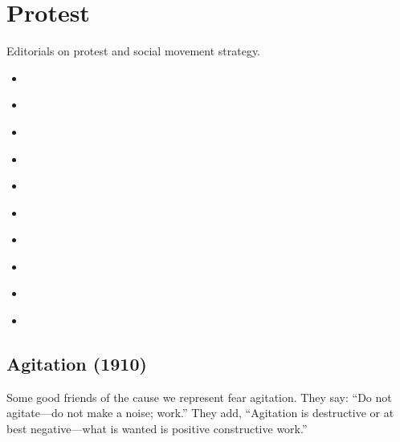 \documentclass[letterpaper,10pt,english]{jupyterBook}
\begin{document}
\section{Protest}
\label{\detokenize{Sections/protest:protest}}\label{\detokenize{Sections/protest::doc}}
\sphinxAtStartPar
Editorials on protest and social movement strategy.
\begin{itemize}
\item {} 
\sphinxAtStartPar
{\hyperref[\detokenize{Volumes/01/01/Agitation::doc}]{}}

\item {} 
\sphinxAtStartPar
{\hyperref[\detokenize{Volumes/05/05/proper_way::doc}]{}}

\item {} 
\sphinxAtStartPar
{\hyperref[\detokenize{Volumes/16/03/close_ranks::doc}]{}}

\item {} 
\sphinxAtStartPar
{\hyperref[\detokenize{Volumes/19/01/statement::doc}]{}}

\item {} 
\sphinxAtStartPar
{\hyperref[\detokenize{Volumes/12/06/negro_party::doc}]{}}

\item {} 
\sphinxAtStartPar
{\hyperref[\detokenize{Volumes/22/01/inter-racial_comity::doc}]{}}

\item {} 
\sphinxAtStartPar
{\hyperref[\detokenize{Volumes/24/01/publicity::doc}]{}}

\item {} 
\sphinxAtStartPar
{\hyperref[\detokenize{Volumes/37/03/boycott::doc}]{}}

\item {} 
\sphinxAtStartPar
{\hyperref[\detokenize{Volumes/41/05/violence::doc}]{}}

\item {} 
\sphinxAtStartPar
{\hyperref[\detokenize{Volumes/41/06/counsels_of_despair::doc}]{}}

\end{itemize}


\subsection{Agitation (1910)}
\label{\detokenize{Volumes/01/01/Agitation:agitation-1910}}\label{\detokenize{Volumes/01/01/Agitation::doc}}
\sphinxAtStartPar
Some good friends of the cause we represent fear agitation. They say: “Do not agitate—do not make a noise; work.” They add, “Agitation is destructive or at best negative—what is wanted is positive constructive work.”
\end{document}
